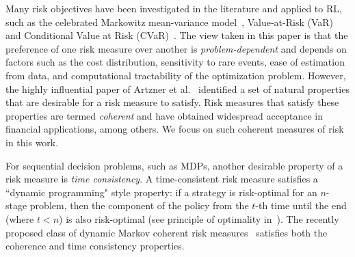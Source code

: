 \documentclass{article} %
\newcommand{\citet}{\cite}
\newcommand{\citealt}{\cite}
\newcommand{\citep}{\cite}
\begin{document}
Many risk objectives have been investigated in the literature and applied to RL, such as the celebrated Markowitz mean-variance model~\cite{Markowitz59PS}, Value-at-Risk (VaR) and Conditional Value at Risk (CVaR)~\citep{moody2001learning,tamar2012policy,prashanth2013actor,delage_percentile_2010,chow2014cvar,tamar2015optimizing}. The view taken in this paper is that the preference of one risk measure over another is \emph{problem-dependent} and depends on factors such as the cost distribution, sensitivity to rare events, ease of estimation from data, and computational tractability of the optimization problem. However, the highly influential paper of Artzner et al.~\citet{artzner1999coherent} identified a set of natural properties that are desirable for a risk measure to satisfy. Risk measures that satisfy these properties are termed \emph{coherent} and have obtained widespread acceptance in financial applications, among others. We focus on such coherent measures of risk in this work.

For sequential decision problems, such as MDPs, another desirable property of a risk measure is \emph{time consistency}. A time-consistent risk measure satisfies a ``dynamic programming" style property: if a strategy is risk-optimal for an $n$-stage problem, then the component of the policy from the $t$-th time until the end (where $t<n$) is also risk-optimal (see principle of optimality in~\citealt{Ber2012DynamicProgramming}). The recently proposed class of dynamic Markov coherent risk measures~\citep{ruszczynski2010risk} satisfies both the coherence and time consistency properties.
\end{document}
